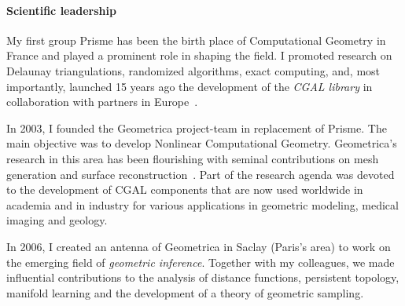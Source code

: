 








\paragraph{Scientific leadership} \mbox{}

My first group Prisme has been the birth place of Computational Geometry in France and played a prominent role in shaping the field. 
I promoted research on Delaunay triangulations, randomized algorithms, exact computing, and, most importantly, launched 15 years ago the development of the {\em CGAL library} in collaboration with partners in Europe~\cite{cgal}.

In 2003, I founded the Geometrica project-team in replacement of Prisme. The main objective was to develop Nonlinear Computational Geometry. 
 Geometrica's research in this area has been flourishing with seminal contributions on mesh generation and surface reconstruction~\cite{geometrica-ecg-book}. Part of the research agenda was devoted to the development of CGAL components that are now used worldwide in academia and in industry for various applications in geometric modeling, medical imaging and geology.

In 2006, I created an antenna of Geometrica in Saclay (Paris's area)  to work on  the emerging field of {\em geometric inference}.  Together with my colleagues, we made influential contributions to the analysis of distance functions, persistent topology, manifold learning and the development of a theory of geometric sampling.

